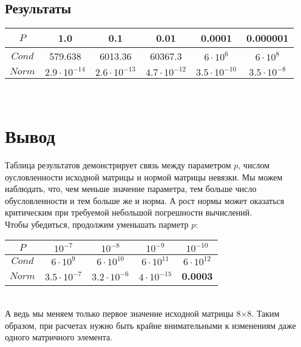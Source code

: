 \documentclass[a4paper,11pt]{article}
\begin{document}
\subsection{Результаты}
\begin{tabular}{ | c | c | c | c | c | c |}
  \hline
  \footnotesize
  $P$ & 1.0 & 0.1 & 0.01 & 0.0001 & 0.000001 \\ \hline
  $Cond$ & 579.638 & 6013.36 & 60367.3 & $6 \cdot 10^6$ & $6 \cdot 10^8$ \\ \hline
  $Norm$ & $2.9 \cdot 10^{-14}$ & $2.6 \cdot 10^{-13}$ & $4.7 \cdot 10^{-12}$ & $3.5 \cdot 10^{-10}$ &
        $3.5 \cdot 10^{-8}$ \\ \hline
\end{tabular} \\

\section{Вывод}
\noindent Таблица результатов демонстрирует связь между параметром $p$, числом оусловленности исходной матрицы
      и нормой матрицы невязки. Мы можем наблюдать, что, чем меньше значение параметра,
      тем больше число обусловленности и тем больше же и норма. А рост нормы может оказаться
      критическим при требуемой небольшой погрешности вычислений. \\

\noindent Чтобы убедиться, продолжим уменьшать парметр $p$: \\

\begin{tabular}{ | c | c | c | c | c |}
  \hline
  \footnotesize
  $P$ & $10^{-7}$ & $10^{-8}$ & $10^{-9}$ & $10^{-10}$ \\ \hline
  $Cond$ & $6 \cdot 10^9$ & $6 \cdot 10^{10}$ & $6 \cdot 10^{11}$ & $6 \cdot 10^{12}$ \\ \hline
  $Norm$ & $3.5 \cdot 10^{-7}$ & $3.2 \cdot 10^{-6}$ & $4 \cdot 10^{-15}$ & \textbf{0.0003} \\ \hline
\end{tabular} \\

\noindent А ведь мы меняем только первое значение исходной матрицы 8$\times$8.
      Таким образом, при расчетах нужно быть крайне внимательными к изменениям даже одного матричного элемента.
\end{document}
